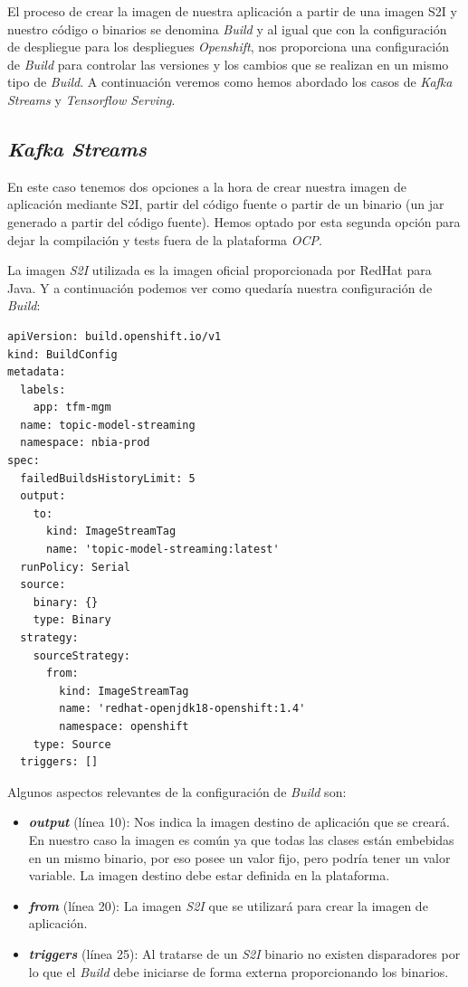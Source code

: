El proceso de crear la imagen de nuestra aplicación a partir de una imagen S2I y nuestro código o binarios se denomina \textit{Build} y al igual que con la configuración de despliegue para los despliegues \textit{Openshift}, nos proporciona una configuración de \textit{Build} para controlar las versiones y los cambios que se realizan en un mismo tipo de \textit{Build}. A continuación veremos como hemos abordado los casos de \textit{Kafka Streams} y \textit{Tensorflow Serving}.


\subsection{\textit{Kafka Streams}}

En este caso tenemos dos opciones a la hora de crear nuestra imagen de aplicación mediante S2I, partir del código fuente o partir de un binario (un jar generado a partir del código fuente). Hemos optado por esta segunda opción para dejar la compilación y tests fuera de la plataforma \textit{OCP}. 

La imagen \textit{S2I} utilizada es la imagen oficial proporcionada por RedHat para Java. Y a continuación podemos ver como quedaría nuestra configuración de \textit{Build}:

\begin{verbatim}
apiVersion: build.openshift.io/v1
kind: BuildConfig
metadata:
  labels:
    app: tfm-mgm
  name: topic-model-streaming
  namespace: nbia-prod
spec:
  failedBuildsHistoryLimit: 5
  output:
    to:
      kind: ImageStreamTag
      name: 'topic-model-streaming:latest'
  runPolicy: Serial
  source:
    binary: {}
    type: Binary
  strategy:
    sourceStrategy:
      from:
        kind: ImageStreamTag
        name: 'redhat-openjdk18-openshift:1.4'
        namespace: openshift
    type: Source
  triggers: []
\end{verbatim}

Algunos aspectos relevantes de la configuración de \textit{Build} son:

\begin{itemize}
\item \textit{\textbf{output}} (línea 10): Nos indica la imagen destino de aplicación que se creará. En nuestro caso la imagen es común ya que todas las clases están embebidas en un mismo binario, por eso posee un valor fijo, pero podría tener un valor variable. La imagen destino debe estar definida en la plataforma. 

\item \textit{\textbf{from}} (línea 20): La imagen \textit{S2I} que se utilizará para crear la imagen de aplicación.

\item \textit{\textbf{triggers}} (línea 25): Al tratarse de un \textit{S2I} binario no existen disparadores por lo que el \textit{Build} debe iniciarse de forma externa proporcionando los binarios.
 
\end{itemize}


